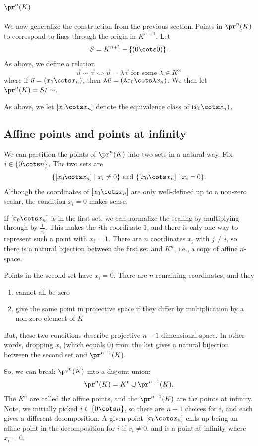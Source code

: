 \documentclass[12pt]{amsart}
\theoremstyle{plain}
\theoremstyle{definition}
\theoremstyle{remark}
\begin{document}
\subsection{$\pr^n(K)$}
We now generalize the construction from the previous section.  
Points in $\pr^n(K)$ to correspond to lines through the origin in
$K^{n+1}$.  Let
\[ S= K^{n+1}-\{(0\cots 0)\}.\]
As above, we define a relation 
\[ \vec u\sim \vec v \iff \vec u=\lambda\vec v \text{ for some $\lambda\in 
K^\times$}\]
where if $\vec u=(x_0\cots x_n)$, then $\lambda\vec u = (\lambda x_0\cots
\lambda x_n)$.
We then let $\pr^n(K)=S/\sim$.

As above, we let $[x_0\cots x_n]$ denote the equivalence class of
$(x_0\cots x_n)$.

\subsection{Affine points and points at infinity}
We can partition the points of $\pr^n(K)$ into two sets in a
natural way.  Fix $i\in\{0\cots n\}$.  The two sets are
\[ \{[x_0\cots x_n] \mid x_i\neq 0\} \text{ and } 
\{[x_0\cots x_n] \mid x_i = 0\}. \]
Although the coordinates of $[x_0\cots x_n]$ are only well-defined
up to a non-zero scalar, the condition $x_i=0$ makes sense.

If $[x_0\cots x_n]$ is in the first set, we can normalize the
scaling by multiplying through by $\frac1{x_i}$.  This makes the
$i$th coordinate $1$, and there is only one way to represent such
a point with $x_i=1$.  There are $n$ coordinates $x_j$ with $j\neq i$,
so there is a natural bijection between the first set and $K^n$, i.e.,
a copy of affine $n$-space.

Points in the second set have $x_i=0$.  There are $n$ remaining coordinates,
and they
\begin{enumerate}
\item cannot all be zero
\item give the same point in projective space if they differ by
multiplication by a non-zero element of $K$
\end{enumerate}
But, these two conditions describe projective $n-1$ dimensional space.
In other words, dropping $x_i$ (which equals $0$) from the list gives
a natural bijection between the second set and $\pr^{n-1}(K)$.

So, we can break $\pr^n(K)$ into a disjoint union:
\[ \pr^n(K) = K^n \cup \pr^{n-1}(K). \]
The $K^n$ are called the affine points, and the $\pr^{n-1}(K)$ are
the points at infinity.  Note, we initially picked $i\in\{0\cots n\}$,
so there are $n+1$ choices for $i$, and each gives a different decomposition.
A given point $[x_0\cots x_n]$ ends up being an affine point in the 
decomposition for $i$ if $x_i\neq 0$, and is a point at infinity where
$x_i=0$.
\end{document}
